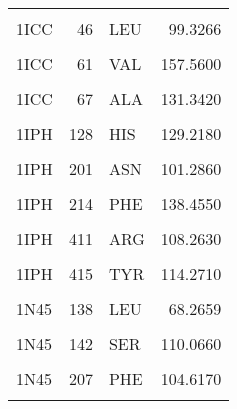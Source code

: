 \begin{table}
\begin{tabular}{lrlr}
			\cellcolor{gray!6}{1ICC} & \cellcolor{gray!6}{45} & \cellcolor{gray!6}{VAL} & \cellcolor{gray!6}{128.6010}\\
			1ICC & 46 & LEU & 99.3266\\
			\cellcolor{gray!6}{1ICC} & \cellcolor{gray!6}{58} & \cellcolor{gray!6}{PHE} & \cellcolor{gray!6}{70.5320}\\
			\addlinespace
			1ICC & 61 & VAL & 157.5600\\
			\cellcolor{gray!6}{1ICC} & \cellcolor{gray!6}{63} & \cellcolor{gray!6}{HIS} & \cellcolor{gray!6}{114.1290}\\
			1ICC & 67 & ALA & 131.3420\\
			\cellcolor{gray!6}{1IPH} & \cellcolor{gray!6}{127} & \cellcolor{gray!6}{VAL} & \cellcolor{gray!6}{129.5510}\\
			1IPH & 128 & HIS & 129.2180\\
			\addlinespace
			\cellcolor{gray!6}{1IPH} & \cellcolor{gray!6}{199} & \cellcolor{gray!6}{VAL} & \cellcolor{gray!6}{124.0950}\\
			1IPH & 201 & ASN & 101.2860\\
			\cellcolor{gray!6}{1IPH} & \cellcolor{gray!6}{206} & \cellcolor{gray!6}{PHE} & \cellcolor{gray!6}{134.5530}\\
			1IPH & 214 & PHE & 138.4550\\
			\cellcolor{gray!6}{1IPH} & \cellcolor{gray!6}{393} & \cellcolor{gray!6}{PRO} & \cellcolor{gray!6}{126.7810}\\
			\addlinespace
			1IPH & 411 & ARG & 108.2630\\
			\cellcolor{gray!6}{1IPH} & \cellcolor{gray!6}{414} & \cellcolor{gray!6}{SER} & \cellcolor{gray!6}{141.7910}\\
			1IPH & 415 & TYR & 114.2710\\
			\cellcolor{gray!6}{1N45} & \cellcolor{gray!6}{135} & \cellcolor{gray!6}{THR} & \cellcolor{gray!6}{60.4070}\\
			1N45 & 138 & LEU & 68.2659\\
			\addlinespace
			\cellcolor{gray!6}{1N45} & \cellcolor{gray!6}{140} & \cellcolor{gray!6}{ASP} & \cellcolor{gray!6}{35.7360}\\
			1N45 & 142 & SER & 110.0660\\
			\cellcolor{gray!6}{1N45} & \cellcolor{gray!6}{147} & \cellcolor{gray!6}{LEU} & \cellcolor{gray!6}{123.9670}\\
			1N45 & 207 & PHE & 104.6170\\
			\cellcolor{gray!6}{1N45} & \cellcolor{gray!6}{25} & \cellcolor{gray!6}{HIS} & \cellcolor{gray!6}{112.7600}\\

\end{tabular}
\end{table}
